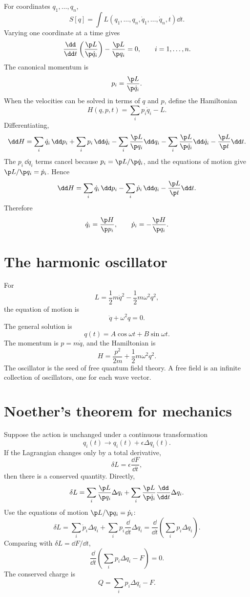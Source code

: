 For coordinates \(q_1,\ldots,q_n\),
\[
  S[q]=\int L(q_1,\ldots,q_n,\dot q_1,\ldots,\dot q_n,t)\dd t.
\]
Varying one coordinate at a time gives
\[
  \frac{\dd}{\dd t}\left(\frac{\p L}{\p\dot q_i}\right)
  -
  \frac{\p L}{\p q_i}=0,
  \qquad i=1,\ldots,n.
\]
The canonical momentum is
\[
  p_i=\frac{\p L}{\p\dot q_i}.
\]
When the velocities can be solved in terms of \(q\) and \(p\), define the Hamiltonian
\[
  H(q,p,t)=\sum_i p_i\dot q_i-L.
\]
Differentiating,
\[
  \dd H
  =
  \sum_i \dot q_i\,\dd p_i
  +\sum_i p_i\,\dd\dot q_i
  -\sum_i\frac{\p L}{\p q_i}\dd q_i
  -\sum_i\frac{\p L}{\p\dot q_i}\dd\dot q_i
  -\frac{\p L}{\p t}\dd t.
\]
The \(p_i\,\dd\dot q_i\) terms cancel because \(p_i=\p L/\p\dot q_i\), and the equations of motion give \(\p L/\p q_i=\dot p_i\).  Hence
\[
  \dd H=\sum_i\dot q_i\,\dd p_i-\sum_i\dot p_i\,\dd q_i-\frac{\p L}{\p t}\dd t.
\]
Therefore
\[
  \dot q_i=\frac{\p H}{\p p_i},
  \qquad
  \dot p_i=-\frac{\p H}{\p q_i}.
\]

\section{The harmonic oscillator}

For
\[
  L=\frac12m\dot q^2-\frac12m\omega^2q^2,
\]
the equation of motion is
\[
  \ddot q+\omega^2q=0.
\]
The general solution is
\[
  q(t)=A\cos\omega t+B\sin\omega t.
\]
The momentum is \(p=m\dot q\), and the Hamiltonian is
\[
  H=\frac{p^2}{2m}+\frac12m\omega^2q^2.
\]
The oscillator is the seed of free quantum field theory.  A free field is an infinite collection of oscillators, one for each wave vector.

\section{Noether's theorem for mechanics}

Suppose the action is unchanged under a continuous transformation
\[
  q_i(t)\to q_i(t)+\epsilon\Delta q_i(t).
\]
If the Lagrangian changes only by a total derivative,
\[
  \delta L=\epsilon\frac{\dd F}{\dd t},
\]
then there is a conserved quantity.  Directly,
\[
  \delta L=
  \sum_i\frac{\p L}{\p q_i}\Delta q_i
  +
  \sum_i\frac{\p L}{\p\dot q_i}\frac{\dd}{\dd t}\Delta q_i.
\]
Use the equations of motion \(\p L/\p q_i=\dot p_i\):
\[
  \delta L=
  \sum_i\dot p_i\Delta q_i+\sum_i p_i\frac{\dd}{\dd t}\Delta q_i
  =
  \frac{\dd}{\dd t}\left(\sum_i p_i\Delta q_i\right).
\]
Comparing with \(\delta L=\dd F/\dd t\),
\[
  \frac{\dd}{\dd t}
  \left(
  \sum_i p_i\Delta q_i-F
  \right)=0.
\]
The conserved charge is
\[
  Q=\sum_i p_i\Delta q_i-F.
\]

